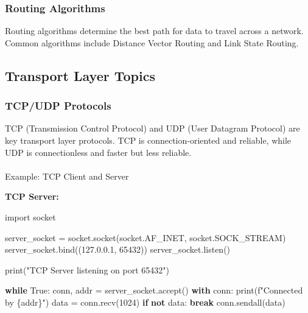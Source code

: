 \documentclass[
  letterpaper,
  DIV=11,
  numbers=noendperiod]{scrreprt}
\makeatletter
\let\oldparagraph\paragraph
\renewcommand{\paragraph}{
    \@ifstar
      \xxxParagraphStar
      \xxxParagraphNoStar
  }
\newcommand{\xxxParagraphStar}[1]{\oldparagraph*{#1}\mbox{}}
\newcommand{\xxxParagraphNoStar}[1]{\oldparagraph{#1}\mbox{}}
\newenvironment{Shaded}{\begin{snugshade}}{\end{snugshade}}
\newcommand{\BuiltInTok}[1]{\textcolor[rgb]{0.00,0.23,0.31}{#1}}
\newcommand{\ControlFlowTok}[1]{\textcolor[rgb]{0.00,0.23,0.31}{\textbf{#1}}}
\newcommand{\DecValTok}[1]{\textcolor[rgb]{0.68,0.00,0.00}{#1}}
\newcommand{\ImportTok}[1]{\textcolor[rgb]{0.00,0.46,0.62}{#1}}
\newcommand{\KeywordTok}[1]{\textcolor[rgb]{0.00,0.23,0.31}{\textbf{#1}}}
\newcommand{\NormalTok}[1]{\textcolor[rgb]{0.00,0.23,0.31}{#1}}
\newcommand{\OperatorTok}[1]{\textcolor[rgb]{0.37,0.37,0.37}{#1}}
\newcommand{\SpecialCharTok}[1]{\textcolor[rgb]{0.37,0.37,0.37}{#1}}
\newcommand{\SpecialStringTok}[1]{\textcolor[rgb]{0.13,0.47,0.30}{#1}}
\newcommand{\StringTok}[1]{\textcolor[rgb]{0.13,0.47,0.30}{#1}}
\newcommand{\VariableTok}[1]{\textcolor[rgb]{0.07,0.07,0.07}{#1}}
\makeatother
\begin{document}
\subsubsection{Routing Algorithms}\label{routing-algorithms}

Routing algorithms determine the best path for data to travel across a
network. Common algorithms include Distance Vector Routing and Link
State Routing.

\subsection{Transport Layer Topics}\label{transport-layer-topics}

\subsubsection{TCP/UDP Protocols}\label{tcpudp-protocols}

TCP (Transmission Control Protocol) and UDP (User Datagram Protocol) are
key transport layer protocols. TCP is connection-oriented and reliable,
while UDP is connectionless and faster but less reliable.

\paragraph{Example: TCP Client and
Server}\label{example-tcp-client-and-server}

\textbf{TCP Server:}

\begin{Shaded}
\begin{Highlighting}[]
\ImportTok{import}\NormalTok{ socket}

\NormalTok{server\_socket }\OperatorTok{=}\NormalTok{ socket.socket(socket.AF\_INET, socket.SOCK\_STREAM)}
\NormalTok{server\_socket.bind((}\StringTok{\textquotesingle{}127.0.0.1\textquotesingle{}}\NormalTok{, }\DecValTok{65432}\NormalTok{))}
\NormalTok{server\_socket.listen()}

\BuiltInTok{print}\NormalTok{(}\StringTok{"TCP Server listening on port 65432"}\NormalTok{)}

\ControlFlowTok{while} \VariableTok{True}\NormalTok{:}
\NormalTok{    conn, addr }\OperatorTok{=}\NormalTok{ server\_socket.accept()}
    \ControlFlowTok{with}\NormalTok{ conn:}
        \BuiltInTok{print}\NormalTok{(}\SpecialStringTok{f"Connected by }\SpecialCharTok{\{}\NormalTok{addr}\SpecialCharTok{\}}\SpecialStringTok{"}\NormalTok{)}
\NormalTok{        data }\OperatorTok{=}\NormalTok{ conn.recv(}\DecValTok{1024}\NormalTok{)}
        \ControlFlowTok{if} \KeywordTok{not}\NormalTok{ data:}
            \ControlFlowTok{break}
\NormalTok{        conn.sendall(data)}
\end{Highlighting}
\end{Shaded}
\end{document}
